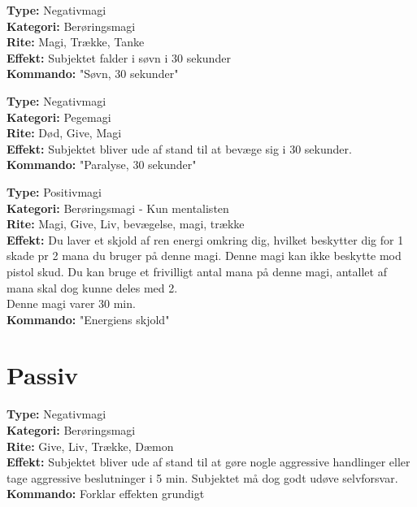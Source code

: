 \begin{defensiv*}[Søvn]
\textbf{Type:} Negativmagi\\
\textbf{Kategori:} Berøringsmagi\\
\textbf{Rite:} Magi, Trække, Tanke\\
\textbf{Effekt:} Subjektet falder i søvn i 30 sekunder\\
\textbf{Kommando:} "Søvn, 30 sekunder"\\
\end{defensiv*}

\begin{defensiv*}[Paralyse]
\textbf{Type:} Negativmagi\\
\textbf{Kategori:} Pegemagi\\
\textbf{Rite:} Død, Give, Magi\\
\textbf{Effekt:} Subjektet bliver ude af stand til at bevæge sig i 30 sekunder.\\
\textbf{Kommando:} "Paralyse, 30 sekunder"\\
\end{defensiv*}

\begin{defensiv*}
\textbf{Type:} Positivmagi\\
\textbf{Kategori:} Berøringsmagi - Kun mentalisten\\
\textbf{Rite:} Magi, Give, Liv, bevægelse, magi, trække\\
\textbf{Effekt:} Du laver et skjold af ren energi omkring dig, hvilket beskytter dig for 1 skade pr 2 mana du bruger på denne magi. Denne magi kan ikke beskytte mod pistol skud. Du kan bruge et frivilligt antal mana på denne magi, antallet af mana skal dog kunne deles med 2.\\
Denne magi varer 30 min.\\
\textbf{Kommando:} "Energiens skjold"
\end{defensiv*}

\section{Passiv}

\begin{passiv*}
\textbf{Type:} Negativmagi\\
\textbf{Kategori:} Berøringsmagi\\
\textbf{Rite:} Give, Liv, Trække, Dæmon\\
\textbf{Effekt:} Subjektet bliver ude af stand til at gøre nogle aggressive handlinger eller tage aggressive beslutninger i 5 min. Subjektet må dog godt udøve selvforsvar.\\
\textbf{Kommando:} Forklar effekten grundigt
\end{passiv*}

